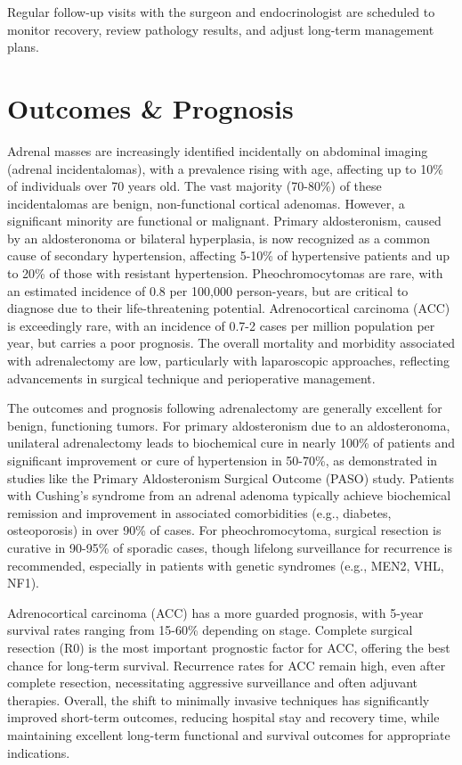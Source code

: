 Regular follow-up visits with the surgeon and endocrinologist are scheduled to monitor recovery, review pathology results, and adjust long-term management plans.

\section*{Outcomes \& Prognosis}
Adrenal masses are increasingly identified incidentally on abdominal imaging (adrenal incidentalomas), with a prevalence rising with age, affecting up to 10\% of individuals over 70 years old. The vast majority (70-80\%) of these incidentalomas are benign, non-functional cortical adenomas. However, a significant minority are functional or malignant. Primary aldosteronism, caused by an aldosteronoma or bilateral hyperplasia, is now recognized as a common cause of secondary hypertension, affecting 5-10\% of hypertensive patients and up to 20\% of those with resistant hypertension. Pheochromocytomas are rare, with an estimated incidence of 0.8 per 100,000 person-years, but are critical to diagnose due to their life-threatening potential. Adrenocortical carcinoma (ACC) is exceedingly rare, with an incidence of 0.7-2 cases per million population per year, but carries a poor prognosis. The overall mortality and morbidity associated with adrenalectomy are low, particularly with laparoscopic approaches, reflecting advancements in surgical technique and perioperative management.

The outcomes and prognosis following adrenalectomy are generally excellent for benign, functioning tumors. For primary aldosteronism due to an aldosteronoma, unilateral adrenalectomy leads to biochemical cure in nearly 100\% of patients and significant improvement or cure of hypertension in 50-70\%, as demonstrated in studies like the Primary Aldosteronism Surgical Outcome (PASO) study. Patients with Cushing's syndrome from an adrenal adenoma typically achieve biochemical remission and improvement in associated comorbidities (e.g., diabetes, osteoporosis) in over 90\% of cases. For pheochromocytoma, surgical resection is curative in 90-95\% of sporadic cases, though lifelong surveillance for recurrence is recommended, especially in patients with genetic syndromes (e.g., MEN2, VHL, NF1).

Adrenocortical carcinoma (ACC) has a more guarded prognosis, with 5-year survival rates ranging from 15-60\% depending on stage. Complete surgical resection (R0) is the most important prognostic factor for ACC, offering the best chance for long-term survival. Recurrence rates for ACC remain high, even after complete resection, necessitating aggressive surveillance and often adjuvant therapies. Overall, the shift to minimally invasive techniques has significantly improved short-term outcomes, reducing hospital stay and recovery time, while maintaining excellent long-term functional and survival outcomes for appropriate indications.

